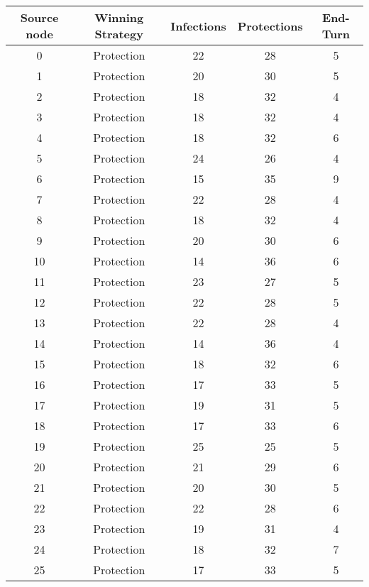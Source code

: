 \documentclass[results.tex]{subfiles}
\begin{document}
\begin{center}
  \begin{tabular}{| c || c | c | c | c |}
    \hline
    {\bfseries Source node} & {\bfseries Winning Strategy} & {\bfseries Infections} & {\bfseries Protections} & {\bfseries End-Turn} \\  %
    \hline\hline
    0 & Protection & 22 & 28 & 5 \\ 
    \hline
    1 & Protection & 20 & 30 & 5 \\ 
    \hline
    2 & Protection & 18 & 32 & 4 \\ 
    \hline
    3 & Protection & 18 & 32 & 4 \\ 
    \hline
    4 & Protection & 18 & 32 & 6 \\ 
    \hline
    5 & Protection & 24 & 26 & 4 \\ 
    \hline
    6 & Protection & 15 & 35 & 9 \\ 
    \hline
    7 & Protection & 22 & 28 & 4 \\ 
    \hline
    8 & Protection & 18 & 32 & 4 \\ 
    \hline
    9 & Protection & 20 & 30 & 6 \\ 
    \hline
    10 & Protection & 14 & 36 & 6 \\ 
    \hline
    11 & Protection & 23 & 27 & 5 \\ 
    \hline
    12 & Protection & 22 & 28 & 5 \\ 
    \hline
    13 & Protection & 22 & 28 & 4 \\ 
    \hline
    14 & Protection & 14 & 36 & 4 \\ 
    \hline
    15 & Protection & 18 & 32 & 6 \\ 
    \hline
    16 & Protection & 17 & 33 & 5 \\ 
    \hline
    17 & Protection & 19 & 31 & 5 \\ 
    \hline
    18 & Protection & 17 & 33 & 6 \\ 
    \hline
    19 & Protection & 25 & 25 & 5 \\ 
    \hline
    20 & Protection & 21 & 29 & 6 \\ 
    \hline
    21 & Protection & 20 & 30 & 5 \\ 
    \hline
    22 & Protection & 22 & 28 & 6 \\ 
    \hline
    23 & Protection & 19 & 31 & 4 \\ 
    \hline
    24 & Protection & 18 & 32 & 7 \\ 
    \hline
    25 & Protection & 17 & 33 & 5 \\ 

\end{tabular}
\end{center}
\end{document}
